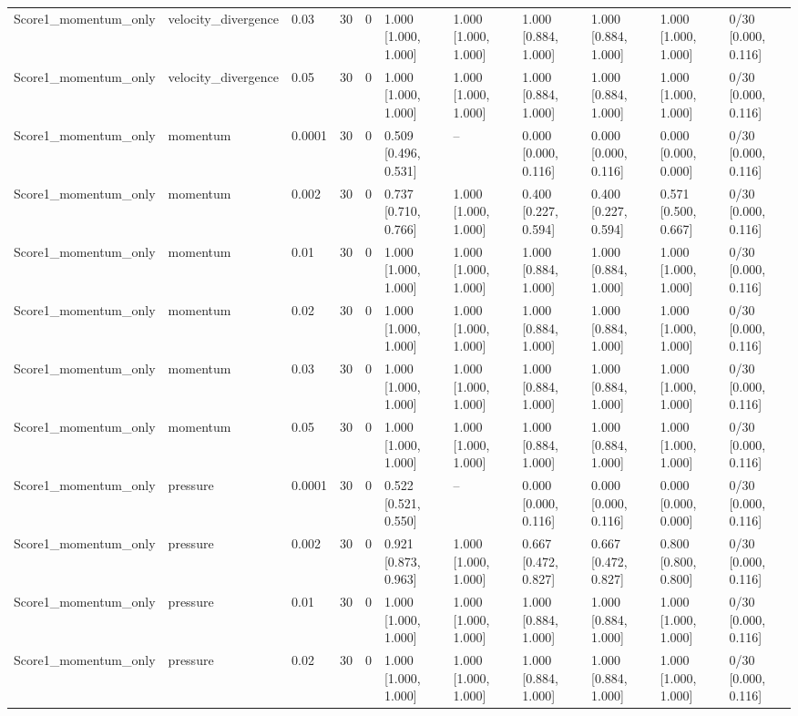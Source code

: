 \begin{longtable}{lllllllllll}
Score1\_momentum\_only & velocity\_divergence & 0.03 & 30 & 0 & 1.000 [1.000, 1.000] & 1.000 [1.000, 1.000] & 1.000 [0.884, 1.000] & 1.000 [0.884, 1.000] & 1.000 [1.000, 1.000] & 0/30 [0.000, 0.116] \\
Score1\_momentum\_only & velocity\_divergence & 0.05 & 30 & 0 & 1.000 [1.000, 1.000] & 1.000 [1.000, 1.000] & 1.000 [0.884, 1.000] & 1.000 [0.884, 1.000] & 1.000 [1.000, 1.000] & 0/30 [0.000, 0.116] \\
Score1\_momentum\_only & momentum & 0.0001 & 30 & 0 & 0.509 [0.496, 0.531] & -- & 0.000 [0.000, 0.116] & 0.000 [0.000, 0.116] & 0.000 [0.000, 0.000] & 0/30 [0.000, 0.116] \\
Score1\_momentum\_only & momentum & 0.002 & 30 & 0 & 0.737 [0.710, 0.766] & 1.000 [1.000, 1.000] & 0.400 [0.227, 0.594] & 0.400 [0.227, 0.594] & 0.571 [0.500, 0.667] & 0/30 [0.000, 0.116] \\
Score1\_momentum\_only & momentum & 0.01 & 30 & 0 & 1.000 [1.000, 1.000] & 1.000 [1.000, 1.000] & 1.000 [0.884, 1.000] & 1.000 [0.884, 1.000] & 1.000 [1.000, 1.000] & 0/30 [0.000, 0.116] \\
Score1\_momentum\_only & momentum & 0.02 & 30 & 0 & 1.000 [1.000, 1.000] & 1.000 [1.000, 1.000] & 1.000 [0.884, 1.000] & 1.000 [0.884, 1.000] & 1.000 [1.000, 1.000] & 0/30 [0.000, 0.116] \\
Score1\_momentum\_only & momentum & 0.03 & 30 & 0 & 1.000 [1.000, 1.000] & 1.000 [1.000, 1.000] & 1.000 [0.884, 1.000] & 1.000 [0.884, 1.000] & 1.000 [1.000, 1.000] & 0/30 [0.000, 0.116] \\
Score1\_momentum\_only & momentum & 0.05 & 30 & 0 & 1.000 [1.000, 1.000] & 1.000 [1.000, 1.000] & 1.000 [0.884, 1.000] & 1.000 [0.884, 1.000] & 1.000 [1.000, 1.000] & 0/30 [0.000, 0.116] \\
Score1\_momentum\_only & pressure & 0.0001 & 30 & 0 & 0.522 [0.521, 0.550] & -- & 0.000 [0.000, 0.116] & 0.000 [0.000, 0.116] & 0.000 [0.000, 0.000] & 0/30 [0.000, 0.116] \\
Score1\_momentum\_only & pressure & 0.002 & 30 & 0 & 0.921 [0.873, 0.963] & 1.000 [1.000, 1.000] & 0.667 [0.472, 0.827] & 0.667 [0.472, 0.827] & 0.800 [0.800, 0.800] & 0/30 [0.000, 0.116] \\
Score1\_momentum\_only & pressure & 0.01 & 30 & 0 & 1.000 [1.000, 1.000] & 1.000 [1.000, 1.000] & 1.000 [0.884, 1.000] & 1.000 [0.884, 1.000] & 1.000 [1.000, 1.000] & 0/30 [0.000, 0.116] \\
Score1\_momentum\_only & pressure & 0.02 & 30 & 0 & 1.000 [1.000, 1.000] & 1.000 [1.000, 1.000] & 1.000 [0.884, 1.000] & 1.000 [0.884, 1.000] & 1.000 [1.000, 1.000] & 0/30 [0.000, 0.116] \\

\end{longtable}
